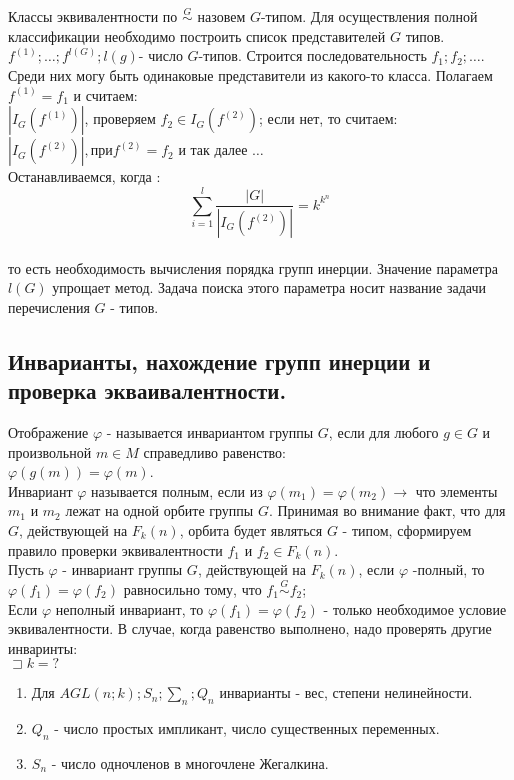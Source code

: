 Классы эквивалентности по $\stackrel{G}{\sim}$ назовем $G$-типом. Для осуществления полной классификации необходимо построить список представителей $G$ типов.
$f^{(1)};\dots; f^{l(G)}; l(g)$- число $G$-типов.
Строится последовательность $f_1;f_2;\dots $. Среди них могу быть одинаковые представители из какого-то класса. Полагаем $ f^{(1)}=f_1$ и считаем:\\ 
$|I_G(f^{(1)})|$, проверяем $f_2 \in I_G(f^{(2)})$; если нет, то считаем:\\
$|I_G(f^{(2)})|, при f^{(2)} =f_2$ и так далее $\dots$\\
Останавливаемся, когда :\\
$$ \sum_{i=1}^{l} \frac{|G|}{|I_G(f^{(2)})|} = k^{k^n} $$\\ то есть необходимость вычисления порядка групп инерции. Значение параметра $l(G)$ упрощает метод. Задача поиска этого параметра носит название задачи перечисления $G$ - типов.\\

\subsection{Инварианты, нахождение групп инерции и проверка экваивалентности.}

\opr 
Отображение $\varphi$ - называется инвариантом группы $G$, если для любого $g \in G$ и произвольной $m \in M$ справедливо равенство:\\
$\varphi(g(m))=\varphi(m)$.\\
Инвариант $\varphi$ называется полным, если из $\varphi (m_1) = \varphi(m_2) \rightarrow $ что элементы $m_1 $ и $m_2$ лежат на одной орбите группы $G$. Принимая во внимание факт, что для $G$, действующей на $F_k(n)$, орбита будет являться $G$ - типом, сформируем правило проверки эквивалентности $f_1 $ и $f_2 \in F_k(n)$.\\
Пусть $\varphi$ - инвариант группы $G$, действующей на $F_k(n)$, если $\varphi$ -полный, то $\varphi(f_1)=\varphi(f_2) $ равносильно тому, что $f_1 \stackrel{G}{\sim} f_2$;\\
Если $\varphi$ неполный инвариант, то $\varphi(f_1)=\varphi(f_2) $ - только необходимое условие эквивалентности. В случае, когда равенство выполнено, надо проверять другие инваринты:\\

$\sqsupset k = ?$\\
\begin{enumerate}
	\item Для $AGL(n;k); S_n; \sum_n; Q_n $ инварианты - вес, степени нелинейности.
	\item $Q_n$ - число простых импликант, число существенных переменных.
	\item $S_n$ - число одночленов в многочлене Жегалкина.\\
\end{enumerate}

